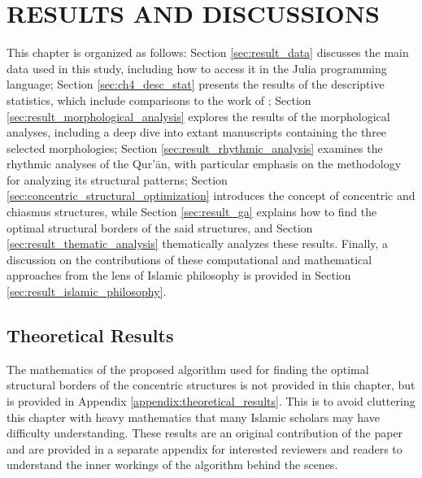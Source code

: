 \chapter{RESULTS AND DISCUSSIONS}\label{ch:results}
This chapter is organized as follows: Section \ref{sec:result_data} discusses the main data used in this study, including how to access it in the Julia programming language; Section \ref{sec:ch4_desc_stat} presents the results of the descriptive statistics, which include comparisons to the work of \cite{sinai2020oqs}; Section \ref{sec:result_morphological_analysis} explores the results of the morphological analyses, including a deep dive into extant manuscripts containing the three selected morphologies; Section \ref{sec:result_rhythmic_analysis} examines the rhythmic analyses of the Qur'\=an, with particular emphasis on the methodology for analyzing its structural patterns; Section \ref{sec:concentric_structural_optimization} introduces the concept of concentric and chiasmus structures, while Section \ref{sec:result_ga} explains how to find the optimal structural borders of the said structures, and Section \ref{sec:result_thematic_analysis} thematically analyzes these results. Finally, a discussion on the contributions of these computational and mathematical approaches from the lens of Islamic philosophy is provided in Section \ref{sec:result_islamic_philosophy}.
\section{Theoretical Results}
The mathematics of the proposed algorithm used for finding the optimal structural borders of the concentric structures is not provided in this chapter, but is provided in Appendix \ref{appendix:theoretical_results}. This is to avoid cluttering this chapter with heavy mathematics that many Islamic scholars may have difficulty understanding. These results are an original contribution of the paper and are provided in a separate appendix for interested reviewers and readers to understand the inner workings of the algorithm behind the scenes.

